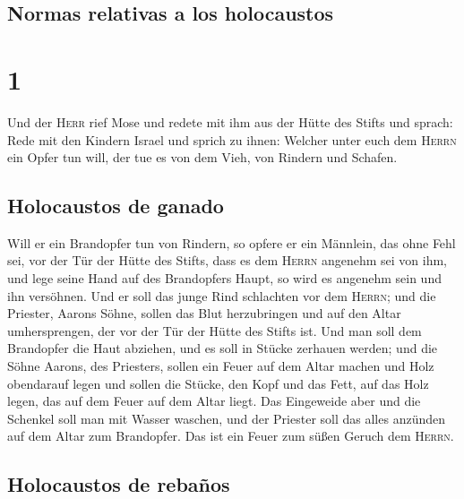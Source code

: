 \hypertarget{normas-relativas-a-los-holocaustos}{%
\subsection{Normas relativas a los
holocaustos}\label{normas-relativas-a-los-holocaustos}}

\hypertarget{section}{%
\section{1}\label{section}}

 Und der \textsc{Herr} rief Mose und redete mit ihm aus
der Hütte des Stifts und sprach:  Rede mit den Kindern
Israel und sprich zu ihnen: Welcher unter euch dem \textsc{Herrn} ein
Opfer tun will, der tue es von dem Vieh, von Rindern und Schafen.

\hypertarget{holocaustos-de-ganado}{%
\subsection{Holocaustos de ganado}\label{holocaustos-de-ganado}}

 Will er ein Brandopfer tun von Rindern, so opfere er ein
Männlein, das ohne Fehl sei, vor der Tür der Hütte des Stifts, dass es
dem \textsc{Herrn} angenehm sei von ihm,  und lege seine
Hand auf des Brandopfers Haupt, so wird es angenehm sein und ihn
versöhnen.  Und er soll das junge Rind schlachten vor dem
\textsc{Herrn}; und die Priester, Aarons Söhne, sollen das Blut
herzubringen und auf den Altar umhersprengen, der vor der Tür der Hütte
des Stifts ist.  Und man soll dem Brandopfer die Haut
abziehen, und es soll in Stücke zerhauen werden;  und die
Söhne Aarons, des Priesters, sollen ein Feuer auf dem Altar machen und
Holz obendarauf legen  und sollen die Stücke, den Kopf und
das Fett, auf das Holz legen, das auf dem Feuer auf dem Altar liegt.
 Das Eingeweide aber und die Schenkel soll man mit Wasser
waschen, und der Priester soll das alles anzünden auf dem Altar zum
Brandopfer. Das ist ein Feuer zum süßen Geruch dem \textsc{Herrn}.

\hypertarget{holocaustos-de-rebauxf1os}{%
\subsection{Holocaustos de rebaños}\label{holocaustos-de-rebauxf1os}}

